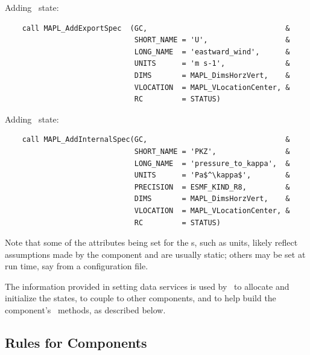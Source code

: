 Adding \ex\ state:
\begin{verbatim}
    call MAPL_AddExportSpec  (GC,                                &
                              SHORT_NAME = 'U',                  &
                              LONG_NAME  = 'eastward_wind',      &
                              UNITS      = 'm s-1',              &
                              DIMS       = MAPL_DimsHorzVert,    &
                              VLOCATION  = MAPL_VLocationCenter, &
                              RC         = STATUS)
\end{verbatim}

Adding \gin\ state:
\begin{verbatim}
    call MAPL_AddInternalSpec(GC,                                &
                              SHORT_NAME = 'PKZ',                &
                              LONG_NAME  = 'pressure_to_kappa',  &
                              UNITS      = 'Pa$^\kappa$',        &
                              PRECISION  = ESMF_KIND_R8,         &
                              DIMS       = MAPL_DimsHorzVert,    &
                              VLOCATION  = MAPL_VLocationCenter, &
                              RC         = STATUS)
\end{verbatim}

Note that some of the attributes being set for the \fld s,
such as units, likely reflect assumptions made by the
component and are usually static; others may be set at run time, say from
a configuration file.

The information provided in setting data
services is used by \ggn\ to allocate and initialize the
states, to couple to other components, and to help build the
component's \IRF\ methods, as described below.


\subsection{Rules for Components}
\label{sec:rules}

